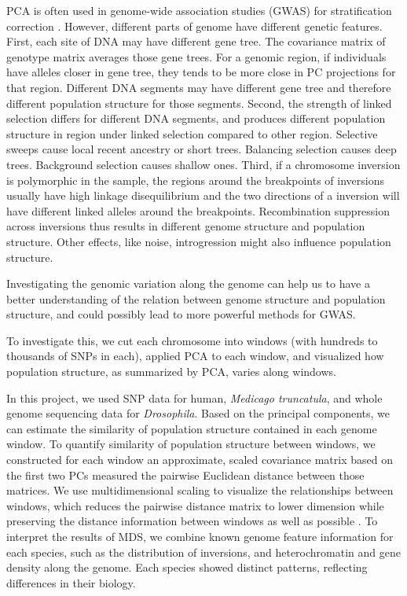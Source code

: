 \documentclass[11pt, oneside]{article}   	%
\begin{document}
PCA is often used in genome-wide association studies (GWAS) for stratification correction \citep{price2006principal}. 
However, different parts of genome have different genetic features. 
First, each site of DNA may have different gene tree. 
The covariance matrix of genotype matrix averages those gene trees. 
For a genomic region, if individuals have alleles closer in gene tree, they tends to be more close in PC projections for that region. 
Different DNA segments may have different gene tree and therefore different population structure for those segments. 
Second, the strength of linked selection differs for different DNA segments, and produces different population structure in region under linked selection compared to other region. 
Selective sweeps cause local recent ancestry or short trees.
Balancing selection causes deep trees.
Background selection causes shallow ones.
Third, if a chromosome inversion is polymorphic in the sample, the regions around the breakpoints of inversions usually have high linkage disequilibrium and the two directions of a inversion will have different linked alleles around the breakpoints. Recombination suppression across inversions thus results in different genome structure and population structure. 
Other effects, like noise, introgression might also influence population structure.

Investigating the genomic variation along the genome can help us to have a
better understanding of the relation between genome structure and population
structure, and could possibly lead to more powerful methods for GWAS.

To investigate this, we cut each chromosome into windows (with hundreds to
thousands of SNPs in each), applied PCA to each window, and visualized how
population structure, as summarized by PCA, varies along windows.

In this project, we used SNP data for human, \textit{Medicago truncatula}, and
whole genome sequencing data for \textit{Drosophila}.  Based on the principal
components, we can estimate the similarity of population structure contained in
each genome window.  To quantify similarity of population structure between
windows, we constructed for each window an approximate, scaled covariance
matrix based on the first two PCs measured the pairwise Euclidean distance
between those matrices.  We use multidimensional scaling to visualize the
relationships between windows, which reduces the pairwise distance matrix to
lower dimension while preserving the distance information between windows as
well as possible \citep{borg2005modern}.  To interpret the results of MDS, we
combine known genome feature information for each species, such as the
distribution of inversions, and heterochromatin and gene density along the
genome. Each species showed distinct patterns, reflecting differences in their
biology. 
\end{document}
